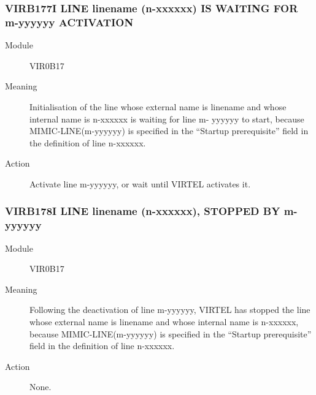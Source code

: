 \documentclass[letterpaper,10pt,english]{sphinxmanual}
\begin{document}
\subsubsection{VIRB177I LINE linename (n-xxxxxx) IS WAITING FOR m-yyyyyy ACTIVATION}
\label{\detokenize{messages:virb177i-line-linename-n-xxxxxx-is-waiting-for-m-yyyyyy-activation}}\begin{description}
\item[{Module}] \leavevmode
VIR0B17

\item[{Meaning}] \leavevmode
Initialisation of the line whose external name is linename and whose internal name is n-xxxxxx is waiting for line m- yyyyyy to start, because MIMIC-LINE(m-yyyyyy) is specified in the “Startup prerequisite” field in the definition of line n-xxxxxx.

\item[{Action}] \leavevmode
Activate line m-yyyyyy, or wait until VIRTEL activates it.

\end{description}


\subsubsection{VIRB178I LINE linename (n-xxxxxx), STOPPED BY m-yyyyyy}
\label{\detokenize{messages:virb178i-line-linename-n-xxxxxx-stopped-by-m-yyyyyy}}\begin{description}
\item[{Module}] \leavevmode
VIR0B17

\item[{Meaning}] \leavevmode
Following the deactivation of line m-yyyyyy, VIRTEL has stopped the line whose external name is linename and whose internal name is n-xxxxxx, because MIMIC-LINE(m-yyyyyy) is specified in the “Startup prerequisite” field in the definition of line n-xxxxxx.

\item[{Action}] \leavevmode
None.

\end{description}
\end{document}
